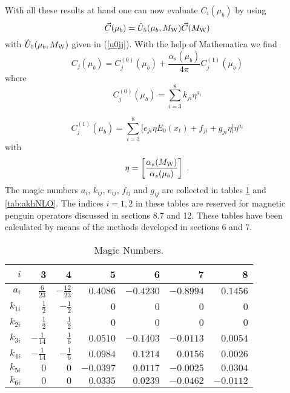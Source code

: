 \documentclass[12pt,rotate]{article}
\def\as{\alpha_s}
\newcommand{\mw}{M_{\rm W}}
\newcommand{\be}{\begin{equation}}
\newcommand{\ee}{\end{equation}}
\begin{document}
\begin{itemize}
\begin{itemize}
With all these results at hand one can now evaluate $C_i(\mu_b)$
by using
\be\label{EVOLC}
\vec C(\mu_b)=\hat U_5(\mu_b,\mw) \vec C(\mw)
\ee
with $\hat U_5(\mu_b,\mw)$ given in (\ref{u0jj}). With the help
of Mathematica we find
\be
C_j(\mu_b)=C_j^{(0)}(\mu_b)+\frac{\as(\mu_b)}{4\pi}C_j^{(1)}(\mu_b)
\ee
where
\be
C_j^{(0)}(\mu_b)=\sum_{i=3}^8 k_{ji}\eta^{a_i}
\ee

\be
C_j^{(1)}(\mu_b)=\sum_{i=3}^8 \lbrack e_{ji}\eta E_0(x_t)+
f_{ji}+g_{ji}\eta\rbrack \eta^{a_i}
\ee
with
\be
\eta=\left[\frac{\as(\mw)}{\as(\mu_b)}\right]~.
\ee
The magic numbers $a_i$,
$k_{ij}$, $e_{ij}$, $f_{ij}$ and $g_{ij}$ are  collected in tables
\ref{tab:akhLO} and \ref{tab:akhNLO}. The indices $i=1,2$ in these
tables are reserved for magnetic penguin operators discussed in
sections 8.7 and 12. These tables have been calculated by means
of the methods developed in sections 6 and 7.

\begin{table}[htb]
\caption[]{Magic Numbers.
\label{tab:akhLO}}
\begin{center}
\begin{tabular}{|r|r|r|r|r|r|r|}
\hline
$i$ & 3 & 4 & 5 & 6 & 7 & 8 \\
\hline
$a_i $& $ \frac{6}{23} $&$
-\frac{12}{23} $&$
0.4086 $&$ -0.4230 $&$ -0.8994 $&$ 0.1456 $\\
$k_{1i} $&$ \frac{1}{2} $&$ - \frac{1}{2} $&$
0 $&$ 0 $&$ 0 $&$ 0 $\\
$k_{2i} $& $ \frac{1}{2} $&$  \frac{1}{2} $&$
0 $&$ 0 $&$ 0 $&$ 0 $\\
$k_{3i} $& $ - \frac{1}{14} $&$  \frac{1}{6} $&$
0.0510 $&$ - 0.1403 $&$ - 0.0113 $&$ 0.0054 $\\
$k_{4i} $& $ - \frac{1}{14} $&$  - \frac{1}{6} $&$
0.0984 $&$ 0.1214 $&$ 0.0156 $&$ 0.0026 $\\
$k_{5i} $& $ 0 $&$  0 $&$
- 0.0397 $&$ 0.0117 $&$ - 0.0025 $&$ 0.0304 $\\
$k_{6i} $&$ 0 $&$  0 $&$
0.0335 $&$ 0.0239 $&$ - 0.0462 $&$ -0.0112 $\\
\hline
\end{tabular}
\end{center}
\end{table}



\end{itemize}
\end{itemize}
\end{document}
